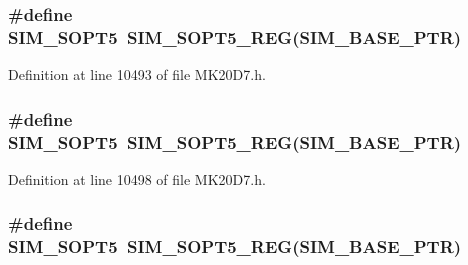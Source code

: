 \subsubsection[{\texorpdfstring{S\+I\+M\+\_\+\+S\+O\+P\+T5}{SIM_SOPT5}}]{\setlength{\rightskip}{0pt plus 5cm}\#define S\+I\+M\+\_\+\+S\+O\+P\+T5~{\bf S\+I\+M\+\_\+\+S\+O\+P\+T5\+\_\+\+R\+EG}({\bf S\+I\+M\+\_\+\+B\+A\+S\+E\+\_\+\+P\+TR})}\hypertarget{group___s_i_m___register___accessor___macros_gaf35448e6b1a656ae66edd79699521557}{}\label{group___s_i_m___register___accessor___macros_gaf35448e6b1a656ae66edd79699521557}


Definition at line 10493 of file M\+K20\+D7.\+h.

\subsubsection[{\texorpdfstring{S\+I\+M\+\_\+\+S\+O\+P\+T5}{SIM_SOPT5}}]{\setlength{\rightskip}{0pt plus 5cm}\#define S\+I\+M\+\_\+\+S\+O\+P\+T5~{\bf S\+I\+M\+\_\+\+S\+O\+P\+T5\+\_\+\+R\+EG}({\bf S\+I\+M\+\_\+\+B\+A\+S\+E\+\_\+\+P\+TR})}\hypertarget{group___s_i_m___register___accessor___macros_gaf35448e6b1a656ae66edd79699521557}{}\label{group___s_i_m___register___accessor___macros_gaf35448e6b1a656ae66edd79699521557}


Definition at line 10498 of file M\+K20\+D7.\+h.

\subsubsection[{\texorpdfstring{S\+I\+M\+\_\+\+S\+O\+P\+T5}{SIM_SOPT5}}]{\setlength{\rightskip}{0pt plus 5cm}\#define S\+I\+M\+\_\+\+S\+O\+P\+T5~{\bf S\+I\+M\+\_\+\+S\+O\+P\+T5\+\_\+\+R\+EG}({\bf S\+I\+M\+\_\+\+B\+A\+S\+E\+\_\+\+P\+TR})}\hypertarget{group___s_i_m___register___accessor___macros_gaf35448e6b1a656ae66edd79699521557}{}\label{group___s_i_m___register___accessor___macros_gaf35448e6b1a656ae66edd79699521557}


